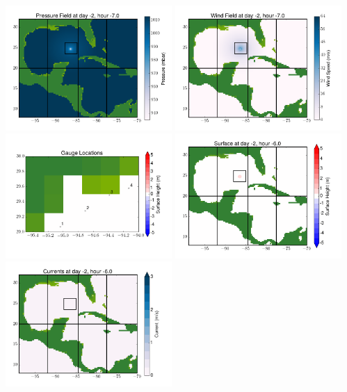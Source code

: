 \documentclass[11pt]{article}
\begin{document}
\includegraphics[width=0.475\textwidth]{frame0017fig8.png}
\vskip 10pt 
\includegraphics[width=0.475\textwidth]{frame0017fig9.png}
\includegraphics[width=0.475\textwidth]{frame0017fig10.png}
\vskip 10pt 
\includegraphics[width=0.475\textwidth]{frame0018fig1.png}
\includegraphics[width=0.475\textwidth]{frame0018fig2.png}
\end{document}
